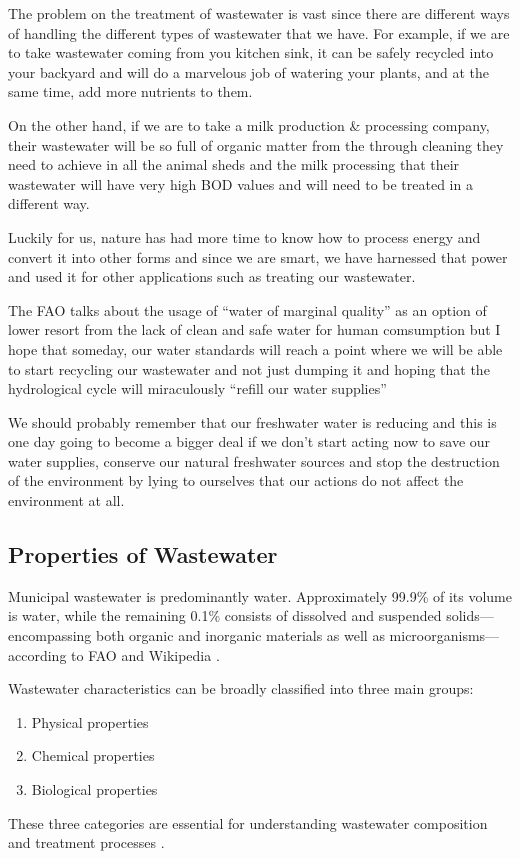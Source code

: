 The problem on the treatment of wastewater is vast since there are different ways of handling the different types of wastewater that we have. For example, if we are to take wastewater coming from you kitchen sink, it can be safely recycled into your backyard and will do a marvelous job of watering your plants, and at the same time, add more nutrients to them.

On the other hand, if we are to take a milk production \& processing company, their wastewater will be so full of organic matter from the through cleaning they need to achieve in all the animal sheds and the milk processing that their wastewater will have very high BOD values and will need to be treated in a different way.

Luckily for us, nature has had more time to know how to process energy and convert it into other forms and since we are smart, we have harnessed that power and used it for other applications such as treating our wastewater. 

The FAO talks about the usage of \enquote{water of marginal quality}\cite{fao_wastewater} as an option of lower resort from the lack of clean and safe water for human comsumption but I hope that someday, our water standards will reach a point where we will be able to start recycling our wastewater and not just dumping it and hoping that the hydrological cycle will miraculously \enquote{refill our water supplies}

We should probably remember that our freshwater water is reducing and this is one day going to become a bigger deal if we don't start acting now to save our water supplies, conserve our natural freshwater sources and stop the destruction of the environment by lying to ourselves that our actions do not affect the environment at all.

\subsection{Properties of Wastewater}
Municipal wastewater is predominantly water. Approximately 99.9\% of its volume is water, while the remaining 0.1\% consists of dissolved and suspended solids—encompassing both organic and inorganic materials as well as microorganisms—according to FAO and Wikipedia \cite{fao_wastewater,sewage_wikipedia}.

Wastewater characteristics can be broadly classified into three main groups:
\begin{enumerate}
  \item Physical properties
  \item Chemical properties
  \item Biological properties
\end{enumerate}

These three categories are essential for understanding wastewater composition and treatment processes \cite{scienceinfo_wastewater}. 